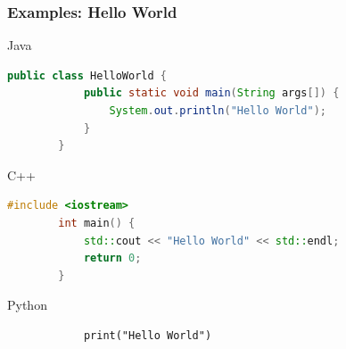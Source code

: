 \documentclass[10pt, a4paper]{beamer} %
\begin{document}
\begin{frame}\frametitle{Examples: Hello World}
    \begin{block}{Java}
    {
    \begin{lstlisting}[language=Java]
        public class HelloWorld {
            public static void main(String args[]) {
                System.out.println("Hello World");
            }
        }
    \end{lstlisting}    
    }
    \end{block}
    
    \begin{block}{C++}
    {
    \begin{lstlisting}[language=C++, morekeywords=include]
        #include <iostream>
        int main() {
            std::cout << "Hello World" << std::endl;
            return 0;
        }
    \end{lstlisting}    
    }
    \end{block}
    \framebreak
    \begin{block}{Python}
        \begin{lstlisting}
            print("Hello World")
        \end{lstlisting}
    \end{block}
    
\end{frame}
\end{document}
